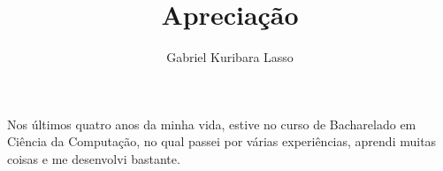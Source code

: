 \documentclass{article}
\title{Apreciação}
\author{Gabriel Kuribara Lasso}
\date{}
\begin{document}
\maketitle
Nos últimos quatro anos da minha vida, estive no curso de Bacharelado em Ciência da Computação, no qual passei por várias experiências, aprendi muitas coisas e me desenvolvi bastante.
\end{document}
